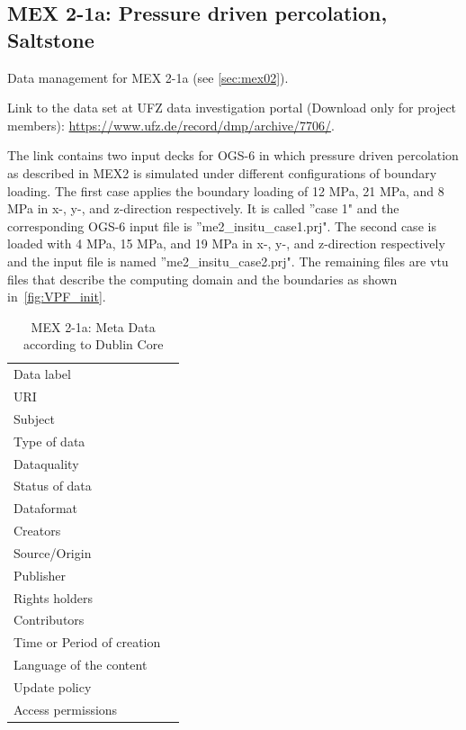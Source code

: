 \subsection{MEX 2-1a: Pressure driven percolation, Saltstone}

Data management for MEX 2-1a (see \ref{sec:mex02}).

Link to the data set at UFZ data investigation portal (Download only for project members):
\hyperlink{https://www.ufz.de/record/dmp/archive/7706/}{https://www.ufz.de/record/dmp/archive/7706/}.

The link contains two input decks for OGS-6 in which pressure driven percolation as described in MEX2 is simulated under different configurations of boundary loading.
The first case applies the boundary loading of 12 MPa, 21 MPa, and 8 MPa in x-, y-, and z-direction respectively. It is called ''case 1" and the corresponding OGS-6 input file is ''me2\_insitu\_case1.prj".
The second case is loaded with 4 MPa, 15 MPa, and 19 MPa in x-, y-, and z-direction respectively and the input file is named ''me2\_insitu\_case2.prj".
The remaining files are vtu files that describe the computing domain and the boundaries as shown in~\ref{fig:VPF_init}.

\begin{table}[!ht]
\caption{MEX 2-1a: Meta Data according to Dublin Core}
\label{tab:dms-mex2-1a}
\small
\begin{tabular}{R{3cm}|L{7cm}}
\hline
%
Data label &  \\
URI &  \\
Subject  &  \\
Type of data  &  \\
Dataquality  &  \\
Status of data  &  \\
Dataformat  & \\
Creators  &  \\
Source/Origin &  \\
Publisher  &  \\
Rights holders &  \\
Contributors &  \\
Time or Period of creation &  \\
Language of the content &  \\
Update policy &  \\
Access permissions &  \\
%
\hline
\end{tabular}
\end{table}

